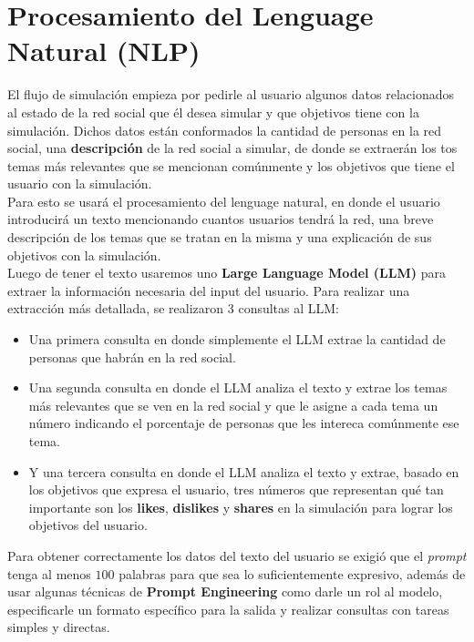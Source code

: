 \documentclass[12pt]{article}
\begin{document}
\section{Procesamiento del Lenguage Natural (NLP)}

El flujo de simulación empieza por pedirle al usuario algunos datos relacionados al estado de la red social que él desea simular y que objetivos tiene con la simulación.
Dichos datos están conformados la cantidad de personas en la red social, una \textbf{descripción} de la red social a simular, de donde se extraerán los tos temas más 
relevantes que se mencionan comúnmente y los objetivos que tiene  el usuario con la simulación.
\\
Para esto se usará el procesamiento del lenguage natural, en donde el usuario introducirá un texto mencionando cuantos usuarios tendrá la red, una breve descripción de los
temas que se tratan en la misma y una explicación de sus objetivos con la simulación.
\\
Luego de tener el texto usaremos uno \textbf{Large Language Model (LLM)} para extraer la información necesaria del input del usuario.
Para realizar una extracción más detallada, se realizaron 3 consultas al LLM: 

\begin{itemize}
    \item Una primera consulta en donde simplemente el LLM extrae la cantidad de personas que habrán en la red social.
    \item Una segunda consulta en donde el LLM analiza el texto y extrae los temas más relevantes que se ven en la red social y que le asigne a cada tema un número indicando el porcentaje de personas que les intereca comúnmente ese tema.
    \item Y una tercera consulta en donde el LLM analiza el texto y extrae, basado en los objetivos que expresa el usuario, tres números que representan qué tan importante son los \textbf{likes}, \textbf{dislikes} y \textbf{shares} en la simulación para lograr los objetivos del usuario.
\end{itemize}

Para obtener correctamente los datos del texto del usuario se exigió que el \textit{prompt} tenga al menos $100$ palabras para que sea lo suficientemente expresivo, además de usar algunas técnicas de \textbf{Prompt Engineering} como darle un rol al modelo, especificarle un formato específico para
la salida y realizar consultas con tareas simples y directas.
\end{document}
